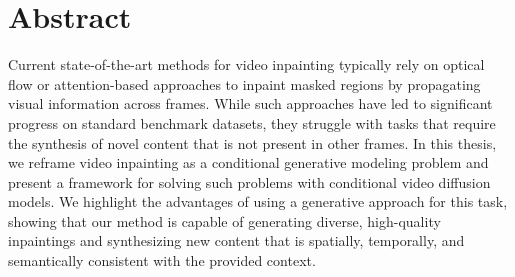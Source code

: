 \chapter{Abstract}
Current state-of-the-art methods for video inpainting typically rely on optical flow or attention-based approaches to inpaint masked regions by propagating visual information across frames. While such approaches have led to significant progress on standard benchmark datasets, they struggle with tasks that require the synthesis of novel content that is not present in other frames. In this thesis, we reframe video inpainting as a conditional generative modeling problem and present a framework for solving such problems with conditional video diffusion models. We highlight the advantages of using a generative approach for this task, showing that our method is capable of generating diverse, high-quality inpaintings and synthesizing new content that is spatially, temporally, and semantically consistent with the provided context.
